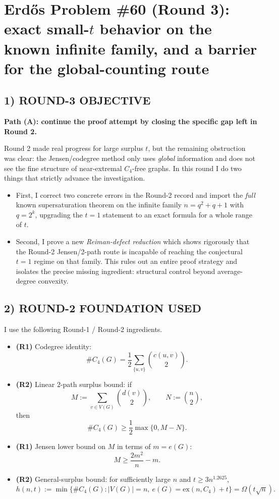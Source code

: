 \section{Erd\H{o}s Problem \#60 (Round 3): exact small-$t$ behavior on the known infinite family, and a barrier for the global-counting route}

\subsection*{1) ROUND-3 OBJECTIVE}
\textbf{Path (A): continue the proof attempt by closing the specific gap left in Round 2.}

Round 2 made real progress for large surplus $t$, but the remaining obstruction was clear: the Jensen/codegree method only uses \emph{global} information and does not see the fine structure of near-extremal $C_4$-free graphs. In this round I do two things that strictly advance the investigation.
\begin{itemize}
\item First, I correct two concrete errors in the Round-2 record and import the \emph{full} known supersaturation theorem on the infinite family $n=q^2+q+1$ with $q=2^k$, upgrading the $t=1$ statement to an exact formula for a whole range of $t$.
\item Second, I prove a new \emph{Reiman-defect reduction} which shows rigorously that the Round-2 Jensen/2-path route is incapable of reaching the conjectural $t=1$ regime on that family. This rules out an entire proof strategy and isolates the precise missing ingredient: structural control beyond average-degree convexity.
\end{itemize}

\subsection*{2) ROUND-2 FOUNDATION USED}
I use the following Round-1 / Round-2 ingredients.
\begin{itemize}
\item \textbf{(R1)} Codegree identity:
\[
\#C_4(G)=\frac12\sum_{\{u,v\}}\binom{c(u,v)}{2}.
\]
\item \textbf{(R2)} Linear $2$-path surplus bound: if
\[
M:=\sum_{v\in V(G)}\binom{d(v)}{2},\qquad N:=\binom{n}{2},
\]
then
\[
\#C_4(G)\ge \frac12\max\{0,M-N\}.
\]
\item \textbf{(R1)} Jensen lower bound on $M$ in terms of $m=e(G)$:
\[
M\ge \frac{2m^2}{n}-m.
\]
\item \textbf{(R2)} General-surplus bound: for sufficiently large $n$ and $t\ge 3n^{1.2625}$,
\[
h(n,t):=\min\{\#C_4(G):|V(G)|=n,\ e(G)=\mathrm{ex}(n,C_4)+t\}=\Omega\!\left(t\sqrt n\right).
\]
\end{itemize}

